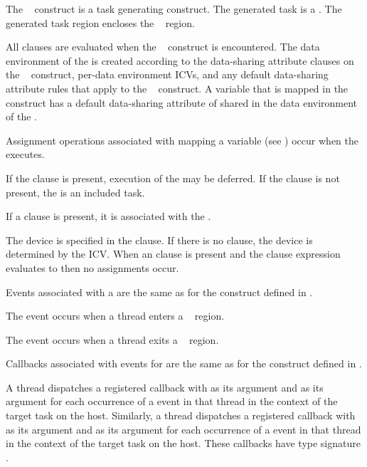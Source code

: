 The ~ construct is a task generating construct.  
The generated task is a .  The generated task region encloses 
the ~ region.

All clauses are evaluated when the ~ construct is 
encountered.  The data environment of the  is created according 
to the data-sharing attribute clauses on the ~ construct, 
per-data environment ICVs, and any default data-sharing attribute rules that apply 
to the ~ construct.  A variable that is mapped in the 
~ construct has a default data-sharing attribute of 
shared in the data environment of the .

Assignment operations associated with mapping a variable (see 
) occur when the  executes.

If the  clause is present, execution of the  may 
be deferred.  If the  clause is not present, the  
is an included task.

If a  clause is present, it is associated with the .

The device is specified in the  clause. If there is no  
clause, the device is determined by the  ICV. When an 
 clause is present and the  clause expression evaluates to 
 then no assignments occur.

\events

Events associated with a  are the same as for the  
construct defined in .

The  event occurs when a thread enters a
~ region.

The  event occurs when a thread exits a
~ region.

\tools

Callbacks associated with events for  are the same as
for the  construct defined in .

A thread dispatches a registered  callback with 
 as its  argument and 
 as its  argument for each occurrence 
of a  event in that thread in the context of the 
target task on the host. Similarly, a thread dispatches a registered 
 callback with  as its 
 argument and  as its  
argument for each occurrence of a  event in that thread 
in the context of the target task on the host. These callbacks have 
type signature . 



